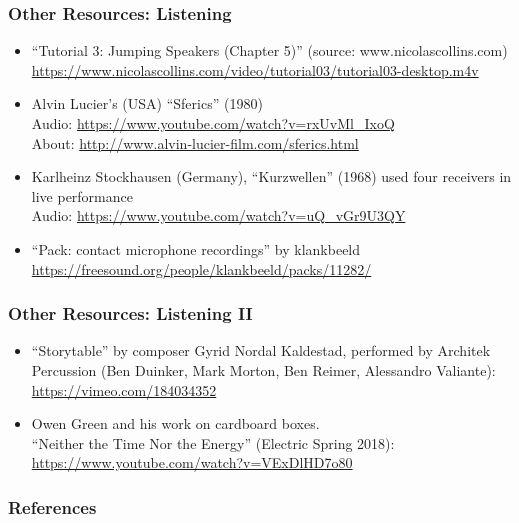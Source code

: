 \documentclass[screen, aspectratio=43]{beamer}
\begin{document}
%
\begin{frame}
  \frametitle{Other Resources: Listening}
    \begin{itemize}
    \item ``Tutorial 3: Jumping Speakers (Chapter 5)'' (source: www.nicolascollins.com)\\
    \url{https://www.nicolascollins.com/video/tutorial03/tutorial03-desktop.m4v}
    \item Alvin Lucier's (USA) ``Sferics'' (1980)\\
    Audio: \url{https://www.youtube.com/watch?v=rxUvMl_IxoQ}\\
    About: \url{http://www.alvin-lucier-film.com/sferics.html}
    \item Karlheinz Stockhausen (Germany), ``Kurzwellen'' (1968) used four receivers in live performance\\
    Audio: \url{https://www.youtube.com/watch?v=uQ_vGr9U3QY}
    \item ``Pack: contact microphone recordings'' by klankbeeld\\
    \url{https://freesound.org/people/klankbeeld/packs/11282/}
    \end{itemize}
\end{frame}
%
\begin{frame}
  \frametitle{Other Resources: Listening II}
    \begin{itemize}
    \item ``Storytable'' by composer Gyrid Nordal Kaldestad, performed by Architek Percussion (Ben Duinker, Mark Morton, Ben Reimer, Alessandro Valiante):\\
    \url{https://vimeo.com/184034352}
    \item Owen Green and his work on cardboard boxes. \\
    ``Neither the Time Nor the Energy'' (Electric Spring 2018): \url{https://www.youtube.com/watch?v=VExDlHD7o80}
    \end{itemize}
\end{frame}
%
\begin{frame}
  \frametitle{References}
  \printbibliography
\end{frame}
%
\end{document}
